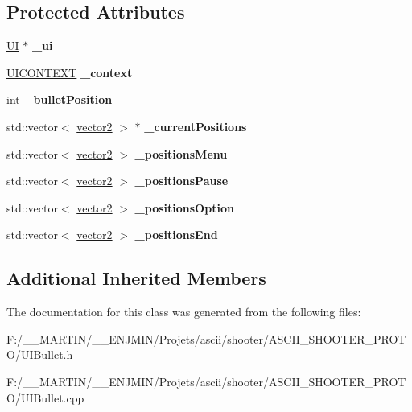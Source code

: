 \subsection*{Protected Attributes}
\begin{DoxyCompactItemize}
\item 
\hypertarget{class_u_i_bullet_a75026bf852c57c18b5b4147cd65b1569}{}\label{class_u_i_bullet_a75026bf852c57c18b5b4147cd65b1569} 
\hyperlink{class_u_i}{UI} $\ast$ {\bfseries \+\_\+ui}
\item 
\hypertarget{class_u_i_bullet_a40405d6b8e46afab0e80e492d18a7605}{}\label{class_u_i_bullet_a40405d6b8e46afab0e80e492d18a7605} 
\hyperlink{struct_u_i_c_o_n_t_e_x_t}{U\+I\+C\+O\+N\+T\+E\+XT} {\bfseries \+\_\+context}
\item 
\hypertarget{class_u_i_bullet_a31d3c1d359452ec5b42818cba93ed826}{}\label{class_u_i_bullet_a31d3c1d359452ec5b42818cba93ed826} 
int {\bfseries \+\_\+bullet\+Position}
\item 
\hypertarget{class_u_i_bullet_a96bef745931cfe60f0589a8bfb3f3c59}{}\label{class_u_i_bullet_a96bef745931cfe60f0589a8bfb3f3c59} 
std\+::vector$<$ \hyperlink{structvector2}{vector2} $>$ $\ast$ {\bfseries \+\_\+current\+Positions}
\item 
\hypertarget{class_u_i_bullet_a86f3119876cf8280f4e3fdf063b066df}{}\label{class_u_i_bullet_a86f3119876cf8280f4e3fdf063b066df} 
std\+::vector$<$ \hyperlink{structvector2}{vector2} $>$ {\bfseries \+\_\+positions\+Menu}
\item 
\hypertarget{class_u_i_bullet_ae76d00fdcf1303e1f5d0044c2f64821c}{}\label{class_u_i_bullet_ae76d00fdcf1303e1f5d0044c2f64821c} 
std\+::vector$<$ \hyperlink{structvector2}{vector2} $>$ {\bfseries \+\_\+positions\+Pause}
\item 
\hypertarget{class_u_i_bullet_a02817d444f3f05df2e8ef4e11df1f9ae}{}\label{class_u_i_bullet_a02817d444f3f05df2e8ef4e11df1f9ae} 
std\+::vector$<$ \hyperlink{structvector2}{vector2} $>$ {\bfseries \+\_\+positions\+Option}
\item 
\hypertarget{class_u_i_bullet_a899fbe9c31a16f1247bbdc07063c6069}{}\label{class_u_i_bullet_a899fbe9c31a16f1247bbdc07063c6069} 
std\+::vector$<$ \hyperlink{structvector2}{vector2} $>$ {\bfseries \+\_\+positions\+End}
\end{DoxyCompactItemize}
\subsection*{Additional Inherited Members}


The documentation for this class was generated from the following files\+:\begin{DoxyCompactItemize}
\item 
F\+:/\+\_\+\+\_\+\+M\+A\+R\+T\+I\+N/\+\_\+\+\_\+\+E\+N\+J\+M\+I\+N/\+Projets/ascii/shooter/\+A\+S\+C\+I\+I\+\_\+\+S\+H\+O\+O\+T\+E\+R\+\_\+\+P\+R\+O\+T\+O/U\+I\+Bullet.\+h\item 
F\+:/\+\_\+\+\_\+\+M\+A\+R\+T\+I\+N/\+\_\+\+\_\+\+E\+N\+J\+M\+I\+N/\+Projets/ascii/shooter/\+A\+S\+C\+I\+I\+\_\+\+S\+H\+O\+O\+T\+E\+R\+\_\+\+P\+R\+O\+T\+O/U\+I\+Bullet.\+cpp\end{DoxyCompactItemize}
